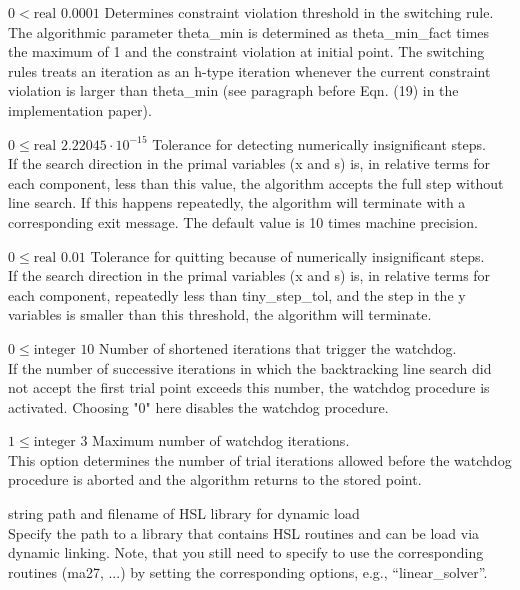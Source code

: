 %
{$0<\textrm{real}$}%
{$0.0001$}%
{Determines constraint violation threshold in the switching rule.\\
The algorithmic parameter theta\_min is determined as theta\_min\_fact times the maximum of 1 and the constraint violation at initial point.  The switching rules treats an iteration as an h-type iteration whenever the current constraint violation is larger than theta\_min (see paragraph before Eqn. (19) in the implementation paper).}%
{}

%
{$0\leq\textrm{real}$}%
{$2.22045 \cdot 10^{-15}$}%
{Tolerance for detecting numerically insignificant steps.\\
If the search direction in the primal variables (x and s) is, in relative terms for each component, less than this value, the algorithm accepts the full step without line search.  If this happens repeatedly, the algorithm will terminate with a corresponding exit message. The default value is 10 times machine precision.}%
{}

%
{$0\leq\textrm{real}$}%
{$0.01$}%
{Tolerance for quitting because of numerically insignificant steps.\\
If the search direction in the primal variables (x and s) is, in relative terms for each component, repeatedly less than tiny\_step\_tol, and the step in the y variables is smaller than this threshold, the algorithm will terminate.}%
{}

%
{$0\leq\textrm{integer}$}%
{$10$}%
{Number of shortened iterations that trigger the watchdog.\\
If the number of successive iterations in which the backtracking line search did not accept the first trial point exceeds this number, the watchdog procedure is activated.  Choosing "0" here disables the watchdog procedure.}%
{}

%
{$1\leq\textrm{integer}$}%
{$3$}%
{Maximum number of watchdog iterations.\\
This option determines the number of trial iterations allowed before the watchdog procedure is aborted and the algorithm returns to the stored point.}%
{}

%
{\textrm{string}}%
{}%
{path and filename of HSL library for dynamic load\\
Specify the path to a library that contains HSL routines and can be load via dynamic linking. Note, that you still need to specify to use the corresponding routines (ma27, ...) by setting the corresponding options, e.g., ``linear\_solver''.}%
{}

